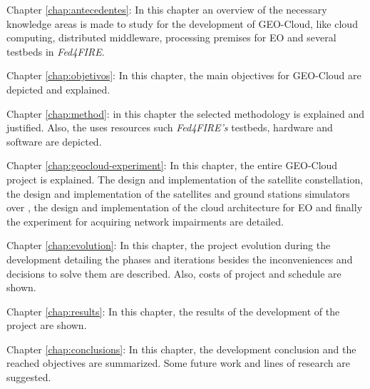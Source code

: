 \begin{definitionlist}
\item[Chapter \ref{chap:antecedentes}: \nameref{chap:antecedentes}] In this
  chapter an overview of the necessary knowledge areas is made to study for the
  development of GEO-Cloud, like cloud computing, distributed middleware,
  processing premises for \ac{EO} and several testbeds in \emph{Fed4FIRE}.
\item[Chapter \ref{chap:objetivos}: \nameref{chap:objetivos}] In this
  chapter, the main objectives for GEO-Cloud are depicted and explained.
\item[Chapter \ref{chap:method}: \nameref{chap:method}] in this chapter the
  selected methodology is explained and justified. Also, the uses resources such
  \emph{Fed4FIRE's} testbeds, hardware and software are depicted.
\item[Chapter \ref{chap:geocloud-experiment}: \nameref{chap:geocloud-experiment}] In this
  chapter, the entire GEO-Cloud project is explained. The design and implementation of the
  satellite constellation, the design and implementation of the satellites and
  ground stations simulators over \vw, the design and implementation of the
  cloud architecture for \ac{EO} and finally the \pl experiment for acquiring
  network impairments are detailed.
\item[Chapter \ref{chap:evolution}: \nameref{chap:evolution}] In this chapter,
  the project evolution during the development detailing the phases and
  iterations besides the inconveniences and decisions to solve them are
  described. Also, costs of project and schedule are shown.
\item[Chapter \ref{chap:results}: \nameref{chap:results}] In this chapter, the
  results of the development of the project are shown.
\item[Chapter \ref{chap:conclusions}: \nameref{chap:conclusions}]In this
  chapter, the development conclusion and the reached objectives are
  summarized. Some future work and lines of research are suggested.
 \end{definitionlist}
